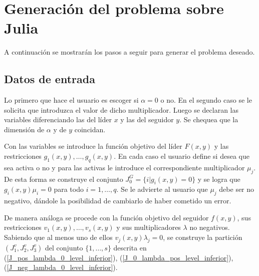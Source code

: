 
\section{Generación del problema sobre Julia}
A continuación se mostrarán los pasos a seguir para generar el problema deseado.
\subsection{Datos de entrada}

Lo primero  que hace el usuario es escoger si $\alpha=0$ o no. En el segundo caso se le solicita que  introduzca el valor de dicho multiplicador. Luego se
declaran las  variables diferenciando las del l\'ider $x$ y las del seguidor $y$. Se chequea que la dimensi\'on de   $\alpha$  y de $y$ coincidan. 

Con las variables se introduce la funci\'on objetivo del l\'ider $F(x,y)$ y las restricciones $ g_1(x,y),\ldots, g_q(x,y)$. En cada caso el usuario define si desea que sea activa o no y para las activas  le introduce el correspondiente multiplicador $\mu_j$. De esta forma se construye el conjunto $J_0^G=\{i | g_i(x,y)=0\}$ y se logra que  $g_i(x,y)\mu_i=0$ para todo $i=1,\ldots,q$. Se le advierte al usuario que $\mu_j$ debe ser no negativo, d\'andole la posibilidad de cambiarlo de haber cometido un error.

De manera an\'aloga se procede con la funci\'on objetivo del seguidor $f(x,y)$,  sus restricciones  $ v_1(x,y),\ldots, v_s(x,y)$ y sus multiplicadores $\lambda$  no negativos. Sabiendo que al menos uno de ellos $v_j(x,y)\lambda_j=0$, se construye la partici\'on $(J_1^v,J_2^v,J_3^v)$  del conjunto $\{1,\ldots,s\}$  descrita en (\ref{J_pos_lambda_0_level_inferior}),  (\ref{J_0_lambda_pos_level_inferior}),  (\ref{J_neg_lambda_0_level_inferior}).

